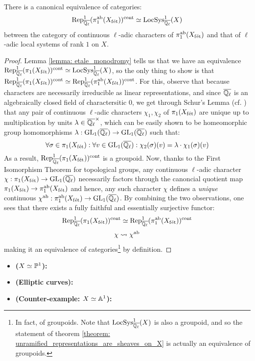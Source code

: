         \begin{theorem} \label{theorem: unramified_representations_are_sheaves_on_X}
            There is a canonical equivalence of categories:
                $$\Rep^1_{\overline{\Q_{\ell}}}(\pi_1^{\ab}(X_{\fet}))^{\cont} \cong \LocSys^1_{\overline{\Q_{\ell}}}(X)$$
            between the category of continuous $\ell$-adic characters of $\pi_1^{\ab}(X_{\fet})$ and that of $\ell$-adic local systems of rank $1$ on $X$.
        \end{theorem}
            \begin{proof}
                Lemma \ref{lemma: etale_monodromy} tells us that we have an equivalence $\Rep^1_{\overline{\Q_{\ell}}}(\pi_1(X_{\fet}))^{\cont} \cong \LocSys^1_{\overline{\Q_{\ell}}}(X)$, so the only thing to show is that $\Rep^1_{\overline{\Q_{\ell}}}(\pi_1(X_{\fet}))^{\cont} \cong \Rep^1_{\overline{\Q_{\ell}}}(\pi_1^{\ab}(X_{\fet}))^{\cont}$. For this, observe that because characters are necessarily irreducible as linear representations, and since $\overline{\Q_{\ell}}$ is an algebraically closed field of charactersitic $0$, we get through Schur's Lemma (cf. \cite[Lemma 3.6, pp. 35]{lam_first_course_in_noncommutative_rings}) that any pair of continuous $\ell$-adic characters $\chi_1, \chi_2$ of $\pi_1(X_{\fet})$ are unique up to multiplication by units $\lambda \in \overline{\Q_{\ell}}^{\x}$, which can be easily shown to be homeomorphic group homomorphisms $\lambda: \GL_1(\overline{\Q_{\ell}}) \to \GL_1(\overline{\Q_{\ell}})$ such that:
                    $$\forall \sigma \in \pi_1(X_{\fet}): \forall v \in \GL_1(\overline{\Q_{\ell}}): \chi_2(\sigma)(v) = \lambda \cdot \chi_1(\sigma)(v)$$
                As a result, $\Rep^1_{\overline{\Q_{\ell}}}(\pi_1(X_{\fet}))^{\cont}$ is a groupoid. Now, thanks to the First Isomorphism Theorem for topological groups, any continuous $\ell$-adic character $\chi: \pi_1(X_{\fet}) \to \GL_1(\overline{\Q_{\ell}})$ necessarily factors through the canoncial quotient map $\pi_1(X_{\fet}) \to \pi_1^{\ab}(X_{\fet})$ and hence, any such character $\chi$ defines a \textit{unique} continuous  $\chi^{\ab}: \pi_1^{\ab}(X_{\fet}) \to \GL_1(\overline{\Q_{\ell}})$. By combining the two observations, one sees that there exists a fully faithful and essentially surjective functor:
                    $$\Rep^1_{\overline{\Q_{\ell}}}(\pi_1(X_{\fet}))^{\cont} \cong \Rep^1_{\overline{\Q_{\ell}}}(\pi_1^{\ab}(X_{\fet}))^{\cont}$$
                    $$\chi \mapsto \chi^{\ab}$$
                making it an equivalence of categories\footnote{In fact, of groupoids. Note that $\LocSys_{\overline{\Q_{\ell}}}^1(X)$ is also a groupoid, and so the statement of theorem \ref{theorem: unramified_representations_are_sheaves_on_X} is actually an equivalence of groupoids.} by definition.
            \end{proof}
        \begin{example}
            \noindent
            \begin{itemize}
                \item \textbf{($X \cong \P^1$):}
                \item \textbf{(Elliptic curves):}
                \item \textbf{(Counter-example: $X \cong \A^1$):}
            \end{itemize}
        \end{example}